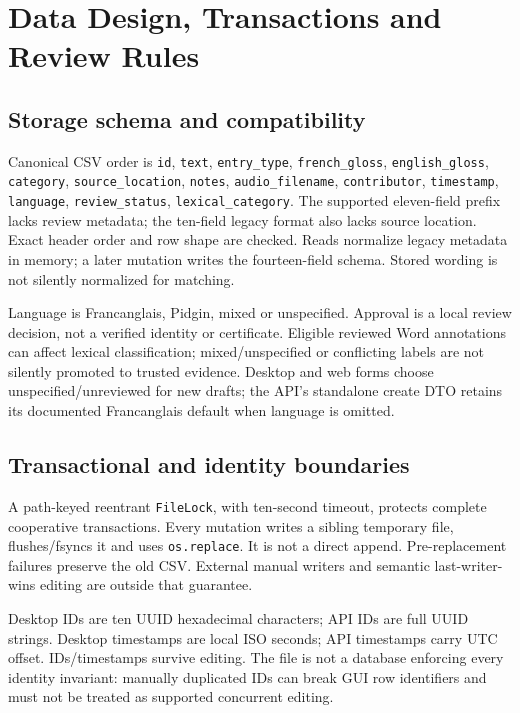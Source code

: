 \documentclass[11pt,a4paper]{article}
\begin{document}
\section{Data Design, Transactions and Review Rules}
\subsection{Storage schema and compatibility}
Canonical CSV order is \nolinkurl{id}, \nolinkurl{text}, \nolinkurl{entry_type},
\nolinkurl{french_gloss}, \nolinkurl{english_gloss}, \nolinkurl{category},
\nolinkurl{source_location}, \nolinkurl{notes}, \nolinkurl{audio_filename},
\nolinkurl{contributor}, \nolinkurl{timestamp}, \nolinkurl{language},
\nolinkurl{review_status}, \nolinkurl{lexical_category}.
The supported eleven-field prefix lacks review metadata; the ten-field legacy
format also lacks source location. Exact header order and row shape are checked.
Reads normalize legacy metadata in memory; a later mutation writes the
fourteen-field schema. Stored wording is not silently normalized for matching.

Language is Francanglais, Pidgin, mixed or unspecified. Approval is a local
review decision, not a verified identity or certificate. Eligible reviewed
Word annotations can affect lexical classification; mixed/unspecified or
conflicting labels are not silently promoted to trusted evidence. Desktop and
web forms choose unspecified/unreviewed for new drafts; the API's standalone
create DTO retains its documented Francanglais default when language is omitted.

\subsection{Transactional and identity boundaries}
A path-keyed reentrant \texttt{FileLock}, with ten-second timeout, protects
complete cooperative transactions. Every mutation writes a sibling temporary
file, flushes/fsyncs it and uses \texttt{os.replace}. It is not a direct append.
Pre-replacement failures preserve the old CSV. External manual writers and
semantic last-writer-wins editing are outside that guarantee.

Desktop IDs are ten UUID hexadecimal characters; API IDs are full UUID strings.
Desktop timestamps are local ISO seconds; API timestamps carry UTC offset.
IDs/timestamps survive editing. The file is not a database enforcing every
identity invariant: manually duplicated IDs can break GUI row identifiers and
must not be treated as supported concurrent editing.
\end{document}
